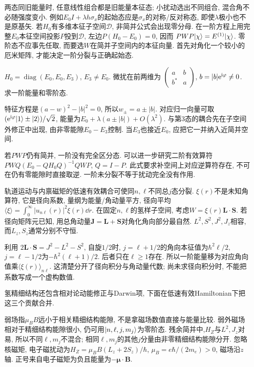 两态同旧能量时, 任意线性组合都是旧能量本征态; 小扰动选出不同组合, 混合角不必随强度变小. 例如$E_0I+\lambda h\sigma_x$的起始态应是$\sigma_x$的对称/反对称态, 即使$\lambda$极小也不是原基矢. 若$H_0$有多维本征子空间$\mathcal D$, 非简并公式会出现零分母. 在一阶方程上用完整$E_0$本征空间投影$P$投到$\mathcal D$, 左边$P(H_0-E_0)=0$, 因而
$PWP\lvert \chi\rangle=E^{(1)}\lvert \chi\rangle$. 零阶态不应事先任取, 而要选$W$在简并子空间内的本征向量. 首先对角化一个较小的厄米矩阵, 才能决定一阶分裂与正确起始态.

\begin{example}
$H_0=\operatorname{diag}(E_0,E_0,E_3)$, $E_3\ne E_0$. 微扰在前两维为 $\begin{pmatrix}a&b\\b^*&a\end{pmatrix}$, $b=|b|\mathrm e^{\mathrm i\varphi}\ne0$. 求一阶能量和零阶态.
\end{example}
\begin{solution}
特征方程是$(a-w)^2-|b|^2=0$, 所以$w_\pm=a\pm|b|$. 对应归一向量可取 $(\mathrm e^{\mathrm i\varphi}\lvert 1\rangle\pm\lvert 2\rangle)/\sqrt2$, 能量为$E_0+\lambda(a\pm|b|)+O(\lambda^2)$. 与第3态的耦合先在子空间外修正中出现, 由非零能隙$E_0-E_3$控制. 当$E_3$也接近$E_0$, 应把它一并纳入近简并空间.
\end{solution}

若$PWP$仍有简并, 一阶没有完全区分态. 可以进一步研究二阶有效算符$PWQ(E_0-QH_0Q)^{-1}QWP$, $Q=I-P$. 此式要求补空间上对应逆算符存在, 不可在仍有零能隙时直接取逆. 一阶未分裂不等于扰动完全没有作用.

轨道运动与内禀磁矩的低速有效耦合可使同$n,\ell$不同总$j$态分裂. $\xi(r)$不是未知角算符, 它是径向系数, 量纲为能量/角动量平方, 径向平均$\langle\xi\rangle=\int_0^\infty|u_{n\ell}(r)|^2\xi(r)\dd r$. 在固定$n,\ell$的氢样子空间, 考虑$W=\xi(r)\boldsymbol L\cdot\boldsymbol S$. 若径向矩阵元已知, 用总角动量$\boldsymbol J=\boldsymbol L+\boldsymbol S$对角化角向部分最自然. $L^2,S^2,J^2,J_z$相容, 而$L_z,S_z$通常分别不守恒.

利用 $2\boldsymbol L\cdot\boldsymbol S=J^2-L^2-S^2$, 自旋$1/2$时, $j=\ell+1/2$的角向本征值为$\hbar^2\ell/2$, $j=\ell-1/2$为$-\hbar^2(\ell+1)/2$. 后者只在$\ell\ge1$存在. 所以一阶能量移为对应角向值乘$\langle\xi(r)\rangle_{n\ell}$. 这清楚分开了径向积分与角动量代数; 尚未求径向积分时, 不能把系数写成一个虚构数值.

氢精细结构还包含相对论动能修正与Darwin项, 下面在低速有效Hamiltonian下把这三个贡献合并.

弱场指$\mu_BB$远小于相关精细结构能隙, 不是拿磁场数值直接与能量比较. 弱外磁场相对于精细结构能隙很小, 仍可用$\lvert n,\ell,j,m_j\rangle$为零阶态. 残余简并中,$H_Z$与$L^2,J_z$对易, 所以不同$\ell,m_j$不混合; 相同$\ell,m_j$的其他$j$分量由非零精细结构能隙分开. 忽略核磁矩, 电子磁扰动为$H_Z=\mu_B B(L_z+2S_z)/\hbar$, $\mu_B=e\hbar/(2m_e)>0$, 磁场沿$z$轴. 正号来自电子磁矩为负且能量为$-\boldsymbol\mu\cdot\boldsymbol B$.

